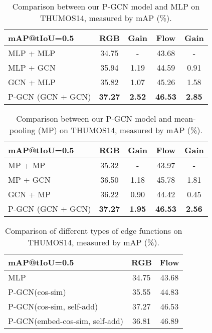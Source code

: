 \documentclass[10pt,twocolumn,letterpaper]{article}
\begin{document}
	\begin{table}[!tb]
		\centering
		\caption{Comparison between our P-GCN model and MLP on THUMOS14, measured by mAP (\%).}
		\vspace{0.1cm}
\begin{tabular}{l|cc|cc}
			\hline
			mAP@tIoU=0.5                & RGB     & Gain      & Flow     & Gain        \\ \hline
			MLP + MLP        & 34.75      & -       & 43.68  & -\\
			MLP + GCN  & 35.94   & 1.19       & 44.59 &0.91 \\
			GCN + MLP  & 35.82   & 1.07        & 45.26  & 1.58 \\
			P-GCN (GCN + GCN)   & \textbf{37.27}   & \textbf{2.52}       & \textbf{46.53}  &  \textbf{2.85}\\ \hline
		\end{tabular}
\label{Tab:twographs}
	\end{table} 
	
	\begin{table}[!tb]
		\centering
		\caption{Comparison between our P-GCN model and mean-pooling (MP) on THUMOS14, measured by mAP (\%).}
		\vspace{0.1cm}
\begin{tabular}{l|cc|cc}
			\hline
			mAP@tIoU=0.5                & RGB     & Gain      & Flow     & Gain        \\ \hline
			MP + MP        & 35.32      & -       & 43.97  & -\\
			MP + GCN  & 36.50   & 1.18       & 45.78 & 1.81 \\
			GCN + MP  & 36.22   & 0.90        & 44.42  & 0.45 \\
			P-GCN (GCN + GCN)   & \textbf{37.27}   & \textbf{1.95}       & \textbf{46.53}  &  \textbf{2.56}\\ \hline
		\end{tabular}
\label{Tab:mean-pooling}
	\end{table} 
	
	
	\begin{table}[!tb]
		\caption{Comparison of different types of edge functions on THUMOS14, measured by mAP (\%).}
		\vspace{0.1cm}
		\centering
\begin{tabular}{l|cc}
			\hline
			mAP@tIoU=0.5                & RGB      & Flow      \\ \hline
			MLP         & 34.75     & 43.68 \\
			P-GCN(cos-sim)   & 35.55    & 44.83   \\
			P-GCN(cos-sim, self-add)    & 37.27  & 46.53 \\ 
			P-GCN(embed-cos-sim, self-add)    & 36.81   & 46.89 \\ \hline 
		\end{tabular}
			 		\vspace{-0.1cm}
		\label{Tab:edge}
	\end{table}
	
\end{document}
